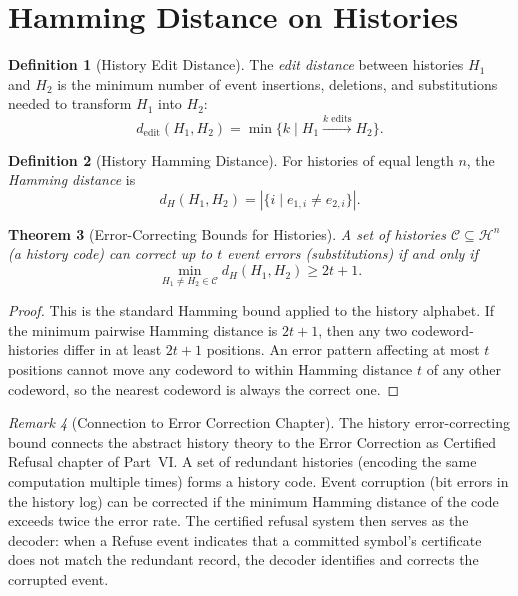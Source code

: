 \documentclass[12pt, a4paper, openany]{book}
\theoremstyle{plain}
\newtheorem{theorem}{Theorem}[chapter]
\theoremstyle{definition}
\newtheorem{definition}[theorem]{Definition}
\theoremstyle{remark}
\newtheorem{remark}[theorem]{Remark}
\newcommand{\calH}{\mathcal{H}}
\begin{document}
\section{Hamming Distance on Histories}

\begin{definition}[History Edit Distance]
The \emph{edit distance} between histories $H_1$ and $H_2$ is the minimum
number of event insertions, deletions, and substitutions needed to transform
$H_1$ into $H_2$:
\[
d_{\mathrm{edit}}(H_1, H_2) = \min\{k \mid H_1 \xrightarrow{k\text{ edits}} H_2\}.
\]
\end{definition}

\begin{definition}[History Hamming Distance]
For histories of equal length $n$, the \emph{Hamming distance} is
\[
d_H(H_1, H_2) = |\{i \mid e_{1,i} \neq e_{2,i}\}|.
\]
\end{definition}

\begin{theorem}[Error-Correcting Bounds for Histories]
A set of histories $\mathcal{C} \subseteq \calH^n$ (a history code) can
correct up to $t$ event errors (substitutions) if and only if
\[
\min_{H_1 \neq H_2 \in \mathcal{C}} d_H(H_1, H_2) \geq 2t + 1.
\]
\end{theorem}

\begin{proof}
This is the standard Hamming bound applied to the history alphabet. If the
minimum pairwise Hamming distance is $2t+1$, then any two codeword-histories
differ in at least $2t+1$ positions. An error pattern affecting at most $t$
positions cannot move any codeword to within Hamming distance $t$ of any
other codeword, so the nearest codeword is always the correct one.
\end{proof}

\begin{remark}[Connection to Error Correction Chapter]
The history error-correcting bound connects the abstract history theory to the
Error Correction as Certified Refusal chapter of Part~VI. A set of redundant
histories (encoding the same computation multiple times) forms a history code.
Event corruption (bit errors in the history log) can be corrected if the
minimum Hamming distance of the code exceeds twice the error rate. The certified
refusal system then serves as the decoder: when a Refuse event indicates that
a committed symbol's certificate does not match the redundant record, the
decoder identifies and corrects the corrupted event.
\end{remark}
\end{document}
